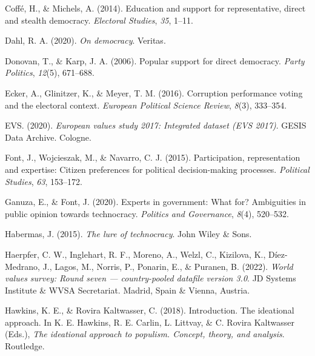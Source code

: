 \documentclass[
  12pt,
  english,
]{article}
\newlength{\cslhangindent}
\newlength{\cslentryspacingunit} %
\newenvironment{CSLReferences}[2] %
 {%
  \setlength{\parindent}{0pt}
  \ifodd #1
  \let\oldpar\par
  \def\par{\hangindent=\cslhangindent\oldpar}
  \fi
  \setlength{\parskip}{#2\cslentryspacingunit}
 }%
 {}
\begin{document}
\begin{CSLReferences}{1}{0}
\leavevmode{}%
Coffé, H., \& Michels, A. (2014). Education and support for
representative, direct and stealth democracy. \emph{Electoral Studies},
\emph{35}, 1--11.

\leavevmode{}%
Dahl, R. A. (2020). \emph{On democracy}. Veritas.

\leavevmode{}%
Donovan, T., \& Karp, J. A. (2006). Popular support for direct
democracy. \emph{Party Politics}, \emph{12}(5), 671--688.

\leavevmode{}%
Ecker, A., Glinitzer, K., \& Meyer, T. M. (2016). Corruption performance
voting and the electoral context. \emph{European Political Science
Review}, \emph{8}(3), 333--354.

\leavevmode{}%
EVS. (2020). \emph{European values study 2017: Integrated dataset (EVS
2017)}. GESIS Data Archive. Cologne.

\leavevmode{}%
Font, J., Wojcieszak, M., \& Navarro, C. J. (2015). Participation,
representation and expertise: Citizen preferences for political
decision-making processes. \emph{Political Studies}, \emph{63},
153--172.

\leavevmode{}%
Ganuza, E., \& Font, J. (2020). Experts in government: What for?
Ambiguities in public opinion towards technocracy. \emph{Politics and
Governance}, \emph{8}(4), 520--532.

\leavevmode{}%
Habermas, J. (2015). \emph{The lure of technocracy}. John Wiley \& Sons.

\leavevmode{}%
Haerpfer, C. W., Inglehart, R. F., Moreno, A., Welzl, C., Kizilova, K.,
Díez-Medrano, J., Lagos, M., Norris, P., Ponarin, E., \& Puranen, B.
(2022). \emph{World values survey: Round seven --- country-pooled
datafile version 3.0}. JD Systems Institute \& WVSA Secretariat. Madrid,
Spain \& Vienna, Austria.

\leavevmode{}%
Hawkins, K. E., \& Rovira Kaltwasser, C. (2018). Introduction. The
ideational approach. In K. E. Hawkins, R. E. Carlin, L. Littvay, \& C.
Rovira Kaltwasser (Eds.), \emph{The ideational approach to populism.
Concept, theory, and analysis}. Routledge.


\end{CSLReferences}
\end{document}
